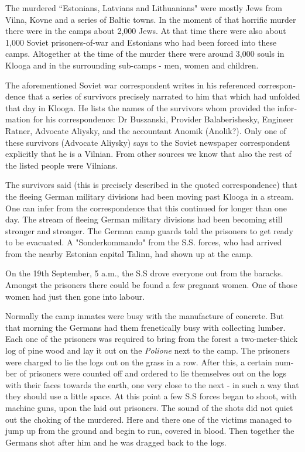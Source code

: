\documentclass{article}
\begin{document}
\begin{pairs}
\begin{Leftside}
\begin{english}
The murdered ``Estonians, Latvians and Lithuanians" were mostly Jews from Vilna, Kovne and a series
of Baltic towns. In the moment of that horrific murder there were in the camps about 2,000 Jews.
At that time there were also about 1,000 Soviet prisoners-of-war and Estonians who had been forced
into these camps. Altogether at the time of the murder there were around 3,000 souls in Klooga and in the 
surrounding sub-camps - men, women and children.

The aforementioned Soviet war correspondent writes in his referenced correspondence that a 
series of survivors precisely narrated to him that which had unfolded that day in Klooga. He lists the names
of the survivors whom provided the information for his correspondence: Dr Buszanski, Provider Balaberishesky,
Engineer Ratner, Advocate Aliysky, and the accountant Anomik (Anolik?). Only one of these survivors (Advocate
Aliysky) says to the Soviet newspaper correspondent explicitly that he is a Vilnian. From other sources we know
that also the rest of the listed people were Vilnians.

The survivors said (this is precisely described in the quoted correspondence) that the fleeing German military
divisions had been moving past Klooga in a stream. One can infer from the correspondence that this continued 
for longer than one day. The stream of fleeing German military divisions had been becoming still stronger and
stronger. The German camp guards told the prisoners to get ready to be evacuated. A "Sonderkommando"
from the S.S. forces, who had arrived from the nearby Estonian capital Talinn, had shown up at the camp.

On the 19th September, 5 a.m., the S.S drove everyone out from the baracks. Amongst the prisoners there could be found
a few pregnant women. One of those women had just then gone into labour.

Normally the camp inmates were busy with the manufacture of concrete. But that morning the Germans had them frenetically
busy with collecting lumber. Each one of the prisoners was required to bring from the forest a two-meter-thick log of pine wood and
lay it out on the \emph{Polione} next to the camp. The prisoners were charged to lie the logs out on the grass in a row. After this,
a certain number of prisoners were counted off and ordered to lie themselves out on the logs with their faces towards the earth,
one very close to the next - in such a way that they should use a little space. At this point a few S.S forces began to shoot, with
machine guns, upon the laid out prisoners. The sound of the shots did not quiet out the choking of the murdered. Here and there
one of the victims managed to jump up from the ground and begin to run, covered in blood. Then together the Germans shot after him 
and he was dragged back to the logs. 


\end{english}
\end{Leftside}
\end{pairs}
\end{document}
